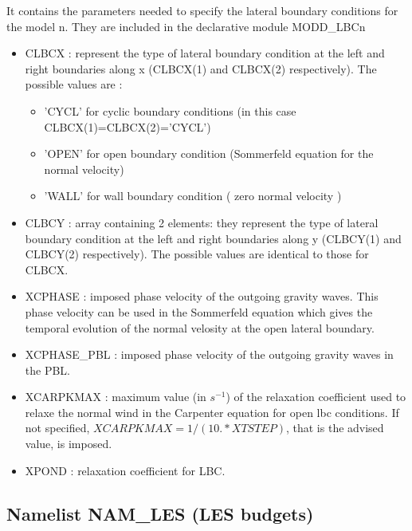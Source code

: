 It contains the parameters needed to specify the lateral boundary conditions for
the model n. They are
included in the declarative module MODD\_LBCn
\begin{itemize}
\item
{}
CLBCX : represent the type of lateral boundary
condition at the left and right boundaries along x (CLBCX(1) and CLBCX(2)
respectively). The possible values are : 
\begin{itemize}
\item 
'CYCL' for cyclic boundary  conditions (in this case CLBCX(1)=CLBCX(2)='CYCL')
\item 
'OPEN' for open boundary condition (Sommerfeld equation for the normal velocity)
\item 
'WALL' for wall boundary   condition ( zero normal velocity )
\end{itemize}
 
\item
{}
CLBCY : array containing 2 elements: they represent the type of lateral boundary
condition at the left and right boundaries along y (CLBCY(1) and CLBCY(2)
respectively). The possible values are identical to those for CLBCX. 

\item
{}
XCPHASE : imposed phase velocity of the outgoing gravity waves. This phase
velocity can be  used in the Sommerfeld equation which gives the temporal
evolution of the normal velosity at the open lateral boundary.  

\item
{}
XCPHASE\_PBL : imposed phase velocity of the outgoing gravity waves in the PBL. 

\item
{}
XCARPKMAX : maximum value (in $s^{-1}$)  of the relaxation coefficient used to
relaxe the normal wind in the Carpenter equation for open lbc conditions.
If not specified,  $XCARPKMAX=1/(10.* XTSTEP)$, that is the advised value, is imposed.

\item
{}
XPOND :  relaxation coefficient for LBC.

\end{itemize}
\newpage
\subsection{Namelist NAM\_LES (LES budgets)}                                          
\label{ss:LESbudget}

